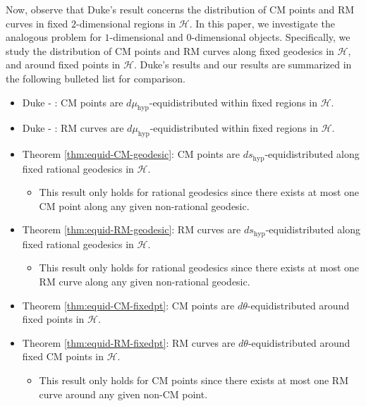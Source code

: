 \documentclass[11pt,letterpaper,reqno]{amsart}
\numberwithin{equation}{section}
\numberwithin{figure}{section}
\numberwithin{table}{section}
\newcommand{\HH}{\mathcal{H}}
\begin{document}
Now, observe that Duke's result concerns the distribution of CM points and RM curves in fixed $2$-dimensional regions in $\HH$.
In this paper, we investigate the analogous problem for $1$-dimensional and $0$-dimensional objects. Specifically, we study the distribution of CM points and RM curves along fixed geodesics in $\HH$, and around fixed points in $\HH$. Duke's results and our results are summarized in the following bulleted list for comparison.


\begin{itemize}
    \item Duke - \cite[Theorem 1 (i)]{duke}: CM points are $d\mu_\mathrm{hyp}$-equidistributed within fixed regions in $\HH$.
    \item Duke - \cite[Theorem 1 (ii)]{duke}: RM curves are $d\mu_\mathrm{hyp}$-equidistributed within fixed regions in $\HH$.
    \item Theorem \ref{thm:equid-CM-geodesic}: CM points are $ds_\mathrm{hyp}$-equidistributed along fixed rational geodesics in $\HH$.
    \begin{itemize}
        \item[$\circ$] This result only holds for rational geodesics since there exists at most one CM point along any given non-rational geodesic.
    \end{itemize}
    \item Theorem \ref{thm:equid-RM-geodesic}: RM curves are $ds_\mathrm{hyp}$-equidistributed along fixed rational geodesics in $\HH$.
    \begin{itemize}
        \item[$\circ$] This result only holds for rational geodesics since there exists at most one RM curve along any given non-rational geodesic.
    \end{itemize}
    \item Theorem \ref{thm:equid-CM-fixedpt}: CM points are $d\theta$-equidistributed around fixed points in $\HH$.
    \item Theorem \ref{thm:equid-RM-fixedpt}: RM curves are $d\theta$-equidistributed around fixed CM points in $\HH$.
    \begin{itemize}
        \item[$\circ$] This result only holds for CM points since there exists at most one RM curve around any given non-CM point. 
    \end{itemize}
\end{itemize}
\end{document}
